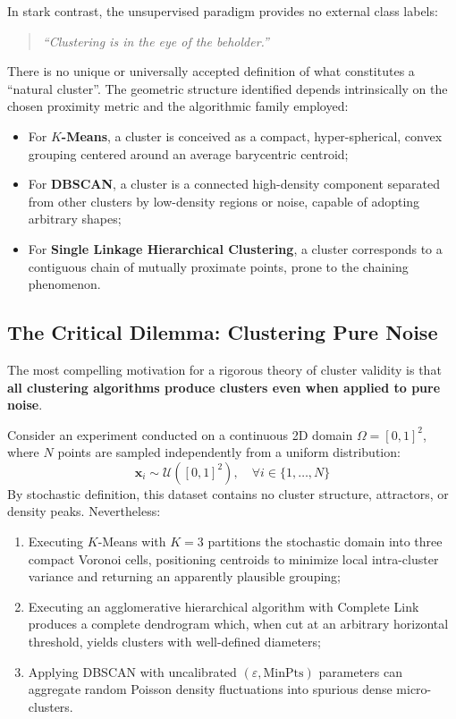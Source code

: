 In stark contrast, the unsupervised paradigm provides no external class labels:
\begin{quote}
\textit{``Clustering is in the eye of the beholder.''}
\end{quote}
There is no unique or universally accepted definition of what constitutes a ``natural cluster''. The geometric structure identified depends intrinsically on the chosen proximity metric and the algorithmic family employed:
\begin{itemize}[noitemsep]
    \item For \textbf{$K$-Means}, a cluster is conceived as a compact, hyper-spherical, convex grouping centered around an average barycentric centroid;
    \item For \textbf{DBSCAN}, a cluster is a connected high-density component separated from other clusters by low-density regions or noise, capable of adopting arbitrary shapes;
    \item For \textbf{Single Linkage Hierarchical Clustering}, a cluster corresponds to a contiguous chain of mutually proximate points, prone to the chaining phenomenon.
\end{itemize}

\subsection{The Critical Dilemma: Clustering Pure Noise}
The most compelling motivation for a rigorous theory of cluster validity is that \textbf{all clustering algorithms produce clusters even when applied to pure noise}.

Consider an experiment conducted on a continuous 2D domain $\Omega = [0, 1]^2$, where $N$ points are sampled independently from a uniform distribution:
\begin{equation}
\label{eq:dm-uniform-noise-generation-en}
\mathbf{x}_i \sim \mathcal{U}\left([0, 1]^2\right), \quad \forall i \in \{1, \dots, N\}
\end{equation}
By stochastic definition, this dataset contains no cluster structure, attractors, or density peaks. Nevertheless:
\begin{enumerate}
    \item Executing $K$-Means with $K=3$ partitions the stochastic domain into three compact Voronoi cells, positioning centroids to minimize local intra-cluster variance and returning an apparently plausible grouping;
    \item Executing an agglomerative hierarchical algorithm with Complete Link produces a complete dendrogram which, when cut at an arbitrary horizontal threshold, yields clusters with well-defined diameters;
    \item Applying DBSCAN with uncalibrated $(\varepsilon, \mathrm{MinPts})$ parameters can aggregate random Poisson density fluctuations into spurious dense micro-clusters.
\end{enumerate}


